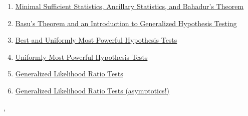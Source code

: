 \documentclass[11pt]{article}
\renewcommand{\today}{\shortmonthname[\the\month] \the \day,  \the\year}
\begin{document}
\begin{enumerate}
	\item \href{https://mp.weixin.qq.com/s/jYHUvNua8_FYa49ygE_SGA}{Minimal Sufficient Statistics, Ancillary Statistics, and Bahadur's Theorem}	%
	\item \href{https://mp.weixin.qq.com/s/jpEjees5Hn2taXYymenYxw}{Basu's Theorem and an Introduction to Generalized Hypothesis Testing}	%
	\item \href{https://mp.weixin.qq.com/s/5jm6s7slohHgt5E6yWU9fg}{Best and Uniformly Most Powerful Hypothesis Tests}	%
	\item \href{https://mp.weixin.qq.com/s/5mzFYMXg4pjCIHtVPrd6qg}{Uniformly Most Powerful Hypothesis Tests}	%
	\item \href{https://mp.weixin.qq.com/s/2A6oZteyExnEpbYhYNFxlg}{Generalized Likelihood Ratio Tests}	%
	\item \href{https://mp.weixin.qq.com/s/5FHygtO5-vnm8G_PEANqWw}{Generalized Likelihood Ratio Tests (asymptotics!)}	%
\end{enumerate}




%
\begin{flushright}
	\tiny \today 
\end{flushright}
\end{document}
